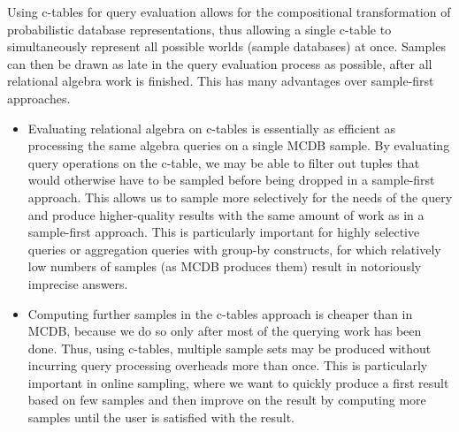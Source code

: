 Using c-tables  for  query evaluation  allows for the compositional  transformation of probabilistic  database representations, thus allowing a single c-table to simultaneously represent  all possible worlds  (sample databases) at once. Samples can then be drawn as late in the query evaluation process as possible,  after all relational algebra work is finished. This has  many advantages over  sample-first approaches.
\begin{itemize}
\addtolength{\topsep}{-0.3ex}
\addtolength{\labelsep}{-0.3ex}
\addtolength{\itemsep}{-1ex}
\item
Evaluating relational algebra on c-tables is  essentially as efficient as processing  the same algebra queries on a  single  MCDB  sample. By evaluating query operations on  the c-table, we may be able  to filter out tuples that would otherwise have to be  sampled before being dropped  in a sample-first approach.  This allows us  to sample more selectively  for the needs of  the query and produce higher-quality results with  the same amount of work as in a sample-first approach. This  is particularly important for highly  selective queries or aggregation queries with group-by constructs, for which relatively low numbers   of   samples   (as   MCDB   produces   them) result in notoriously imprecise answers.

\item
Computing further samples in the c-tables approach is  cheaper than in  MCDB, because  we do  so only  after most  of the querying  work  has been  done.   Thus,  using  c-tables, multiple sample sets may be produced without incurring query processing overheads more than once.  This is particularly important in online  sampling, where we want to  quickly produce  a first  result based on few samples and then  improve on the result by computing more samples until the user is satisfied with the result.

\end{itemize}


